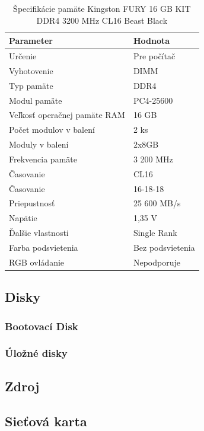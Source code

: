 \documentclass[12pt,oneside,slovak,a4paper]{article}
\begin{document}
\begin{table}[h]
\centering
\begin{tabularx}{\textwidth}{|l|X|}
\hline
\textbf{Parameter} & \textbf{Hodnota} \\ \hline
Určenie & Pre počítač \\ \hline
Vyhotovenie & DIMM \\ \hline
Typ pamäte & DDR4 \\ \hline
Modul pamäte & PC4-25600 \\ \hline
Veľkosť operačnej pamäte RAM & 16 GB \\ \hline
Počet modulov v balení & 2 ks \\ \hline
Moduly v balení & 2x8GB \\ \hline
Frekvencia pamäte & 3 200 MHz \\ \hline
Časovanie & CL16 \\ \hline
Časovanie & 16-18-18 \\ \hline
Priepustnosť & 25 600 MB/s \\ \hline
Napätie & 1,35 V \\ \hline
Ďalšie vlastnosti & Single Rank \\ \hline
Farba podsvietenia & Bez podsvietenia \\ \hline
RGB ovládanie & Nepodporuje \\ \hline
\end{tabularx}
\captionsetup{justification=centering,margin=2cm}
\caption{Špecifikácie pamäte Kingston FURY 16 GB KIT DDR4 3200 MHz CL16 Beast Black}
\end{table}

\subsection{Disky}
\subsubsection{Bootovací Disk}

\subsubsection{Úložné disky}


\subsection{Zdroj}

\subsection{Sieťová karta}
\end{document}
